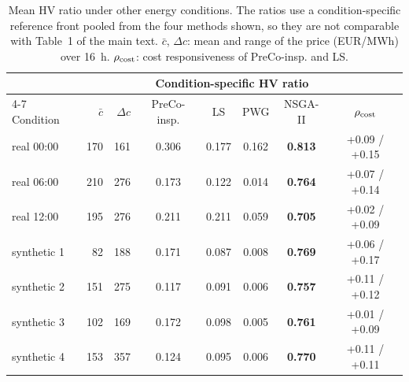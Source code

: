 \begin{table}[htbp]
\centering
\caption{Mean HV ratio under other energy conditions. The ratios use a condition-specific reference front pooled from the four methods shown, so they are not comparable with Table~1 of the main text. $\bar c$, $\Delta c$: mean and range of the price (EUR/MWh) over 16~h. $\rho_{\rm cost}$: cost responsiveness of PreCo-insp. and LS.}
\label{tab:days}
\footnotesize
\setlength{\tabcolsep}{3pt}
\begin{tabular}{lrrccccc}
\toprule
 & & & \multicolumn{4}{c}{Condition-specific HV ratio} & \\
\cmidrule(lr){4-7}
Condition & $\bar c$ & $\Delta c$ & PreCo-insp. & LS & PWG & NSGA-II & $\rho_{\rm cost}$ \\
\midrule
real 00:00 & 170 & 161 & 0.306 & 0.177 & 0.162 & \textbf{0.813} & +0.09 / +0.15 \\
real 06:00 & 210 & 276 & 0.173 & 0.122 & 0.014 & \textbf{0.764} & +0.07 / +0.14 \\
real 12:00 & 195 & 276 & 0.211 & 0.211 & 0.059 & \textbf{0.705} & +0.02 / +0.09 \\
synthetic 1 & 82 & 188 & 0.171 & 0.087 & 0.008 & \textbf{0.769} & +0.06 / +0.17 \\
synthetic 2 & 151 & 275 & 0.117 & 0.091 & 0.006 & \textbf{0.757} & +0.11 / +0.12 \\
synthetic 3 & 102 & 169 & 0.172 & 0.098 & 0.005 & \textbf{0.761} & +0.01 / +0.09 \\
synthetic 4 & 153 & 357 & 0.124 & 0.095 & 0.006 & \textbf{0.770} & +0.11 / +0.11 \\
\bottomrule
\end{tabular}
\end{table}
